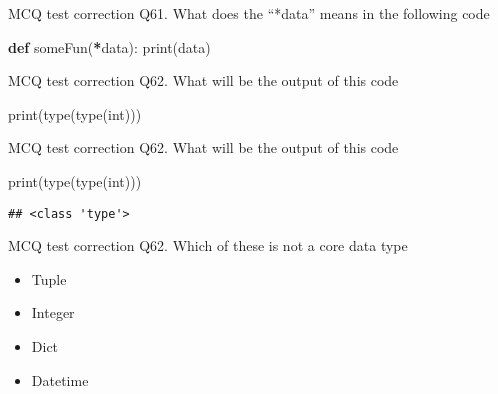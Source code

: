 \documentclass[
  8pt,
  ignorenonframetext,
]{beamer}
\newenvironment{Shaded}{\begin{snugshade}}{\end{snugshade}}
\newcommand{\BuiltInTok}[1]{#1}
\newcommand{\KeywordTok}[1]{\textcolor[rgb]{0.13,0.29,0.53}{\textbf{#1}}}
\newcommand{\NormalTok}[1]{#1}
\newcommand{\OperatorTok}[1]{\textcolor[rgb]{0.81,0.36,0.00}{\textbf{#1}}}
\providecommand{\tightlist}{%
  \setlength{\itemsep}{0pt}\setlength{\parskip}{0pt}}
\begin{document}
\begin{frame}[fragile]{MCQ test correction}
\protect\hypertarget{mcq-test-correction-121}{}
Q61. What does the ``*data'' means in the following code

\begin{Shaded}
\begin{Highlighting}[]
\KeywordTok{def}\NormalTok{ someFun(}\OperatorTok{*}\NormalTok{data):}
    \BuiltInTok{print}\NormalTok{(data)}
\end{Highlighting}
\end{Shaded}
\end{frame}

\begin{frame}[fragile]{MCQ test correction}
\protect\hypertarget{mcq-test-correction-122}{}
Q62. What will be the output of this code

\begin{Shaded}
\begin{Highlighting}[]
\BuiltInTok{print}\NormalTok{(}\BuiltInTok{type}\NormalTok{(}\BuiltInTok{type}\NormalTok{(}\BuiltInTok{int}\NormalTok{)))}
\end{Highlighting}
\end{Shaded}
\end{frame}

\begin{frame}[fragile]{MCQ test correction}
\protect\hypertarget{mcq-test-correction-123}{}
Q62. What will be the output of this code

\begin{Shaded}
\begin{Highlighting}[]
\BuiltInTok{print}\NormalTok{(}\BuiltInTok{type}\NormalTok{(}\BuiltInTok{type}\NormalTok{(}\BuiltInTok{int}\NormalTok{)))}
\end{Highlighting}
\end{Shaded}

\begin{verbatim}
## <class 'type'>
\end{verbatim}
\end{frame}

\begin{frame}{MCQ test correction}
\protect\hypertarget{mcq-test-correction-124}{}
Q62. Which of these is not a core data type

\begin{itemize}
\tightlist
\item
  Tuple
\item
  Integer
\item
  Dict
\item
  Datetime
\end{itemize}
\end{frame}
\end{document}
